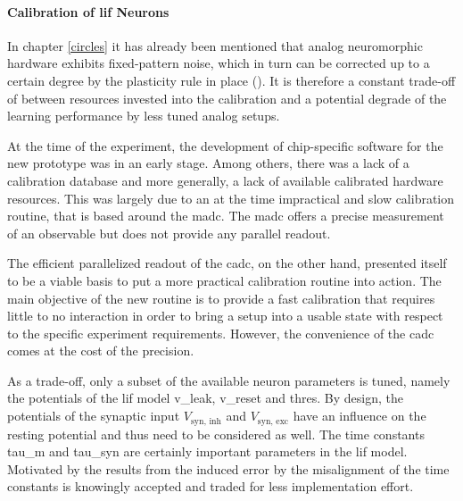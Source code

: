 \paragraph{Calibration of \acrshort{lif} Neurons}
In chapter \cref{circles} it has already been mentioned that analog neuromorphic hardware exhibits fixed-pattern noise, which in turn can be corrected up to a certain degree by the plasticity rule in place (\citealp{wunderlich2019advantages}). It is therefore a constant trade-off of between resources invested into the calibration and a potential degrade of the learning performance by less tuned analog setups.

At the time of the experiment, the development of chip-specific software for the new prototype was in an early stage. Among others, there was a lack of a calibration database and more generally, a lack of available calibrated hardware resources. This was largely due to an at the time impractical and slow calibration routine, that is based around the \gls{madc}. The \gls{madc} offers a precise measurement of an observable but does not provide any parallel readout.

The efficient parallelized readout of the \gls{cadc}, on the other hand, presented itself to be a viable basis to put a more practical calibration routine into action. The main objective of the new routine is to provide a fast calibration that requires little to no interaction in order to bring a setup into a usable state with respect to the specific experiment requirements. However, the convenience of the \gls{cadc} comes at the cost of the precision.

As a trade-off, only a subset of the available neuron parameters is tuned, namely the potentials of the \gls{lif} model \gls{v_leak}, \gls{v_reset} and \gls{thres}. By design, the potentials of the synaptic input $V_\text{syn, inh}$ and $V_\text{syn, exc}$ have an influence on the resting potential and thus need to be considered as well. The time constants \gls{tau_m} and \gls{tau_syn} are certainly important parameters in the \gls{lif} model. Motivated by the results from \cite{wunderlich2019advantages} the induced error by the misalignment of the time constants is knowingly accepted and traded for less implementation effort.

